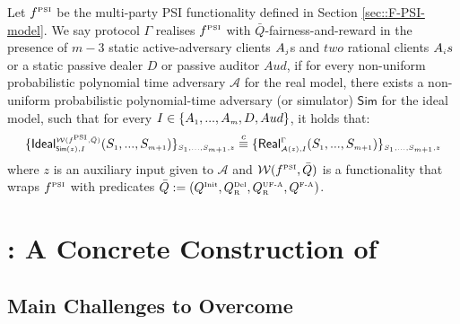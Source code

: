 



\begin{definition}[\ep]\label{def::PSI-Q-fair-reward}
Let $f^{\scriptscriptstyle \text{PSI}}$ be the multi-party PSI functionality defined in Section \ref{sec::F-PSI-model}. We say  protocol $\Gamma$ realises  $f^{\scriptscriptstyle \text{PSI}}$ with $\bar Q$-fairness-and-reward in the presence of $m-3$ static active-adversary clients $A_{\scriptscriptstyle j}$s and $two$ rational clients $A_{\scriptscriptstyle i}s$ or a static passive dealer  $D$ or passive auditor $Aud$, if for every non-uniform probabilistic polynomial time adversary $\mathcal{A}$ for the real model, there exists a non-uniform probabilistic polynomial-time adversary (or simulator) $\mathsf{Sim}$ for the ideal model, such that for every $I\in \{A_{\scriptscriptstyle 1},...,A_{\scriptscriptstyle m}, D, Aud\}$, it holds that: 
%
\begin{equation*}
\{\mathsf {Ideal}^{\scriptscriptstyle \mathcal{W}(f^{\scriptscriptstyle \text{PSI}}, \bar Q)}_{\scriptscriptstyle \mathsf{Sim}(z), I}(S_{\scriptscriptstyle 1},..., S_{\scriptscriptstyle m+1})\}_{\scriptscriptstyle S_{\scriptscriptstyle 1},..., S_{\scriptscriptstyle m+1},z}\stackrel{c}{\equiv} \{\mathsf{Real}_{\scriptscriptstyle \mathcal{A}(z), I}^{\scriptscriptstyle \Gamma}(S_{\scriptscriptstyle 1},..., S_{\scriptscriptstyle m+1}) \}_{\scriptscriptstyle S_{\scriptscriptstyle 1},..., S_{\scriptscriptstyle m+1},z}
\end{equation*}
where  $z$ is an auxiliary input given to $\mathcal{A}$ and  $\mathcal{W}(f^{\scriptscriptstyle \text{PSI}}, \bar Q)$ is a functionality that wraps $f^{\scriptscriptstyle \text{PSI}}$ with predicates $\bar Q:=(Q^{\scriptscriptstyle \text{Init}},  Q^{\scriptscriptstyle \text{Del}}_{\scriptscriptstyle\text{R}}, Q^{\scriptscriptstyle \text{UF-A}}_{\scriptscriptstyle \text{R}}, Q^{\scriptscriptstyle \text{F-A}})$. 
  \end{definition}




\vs


\section{\withRew: A Concrete Construction of \ep}



\subsection{Main Challenges to Overcome}



